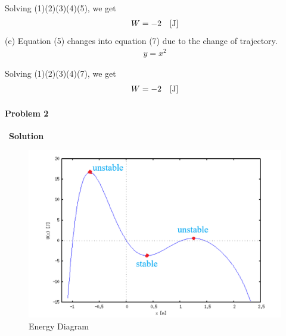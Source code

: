 \documentclass[12pt,a4paper]{article}
\begin{document}
\par Solving (1)(2)(3)(4)(5), we get
\begin{align}
    W = -2\quad [{\rm J}]
\end{align}
\noindent (e) Equation (5) changes into equation (7) due to the change of trajectory.
\begin{align}
    y = x^2
\end{align}
\par Solving (1)(2)(3)(4)(7), we get 
\begin{align}
    W = -2\quad [{\rm J}]
\end{align}

\paragraph{\large \textbf{Problem 2}}~{\textbf{Solution}}
\vspace{2mm}
\begin{figure}[H]
    \centering
    \includegraphics[width=0.7\linewidth]{1.png}
    \caption{Energy Diagram}
    \label{fig-3}
\end{figure}
\end{document}
